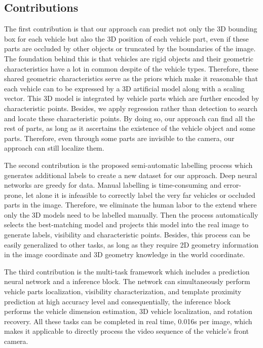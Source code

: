 \subsection{Contributions}

The first contribution is that our approach can predict not only the 3D bounding box for each vehicle but also the 3D position of each vehicle part, even if these parts are occluded by other objects or truncated by the boundaries of the image. The foundation behind this is that vehicles are rigid objects and their geometric characteristics have a lot in common despite of the vehicle types. Therefore, these shared geometric characteristics serve as the priors which make it reasonable that each vehicle can to be expressed by a 3D artificial model along with a scaling vector. This 3D model is integrated by vehicle parts which are further encoded by characteristic points. Besides, we apply regression rather than detection to search and locate these characteristic points. By doing so, our approach can find all the rest of parts, as long as it ascertains the existence of the vehicle object and some parts. Therefore, even through some parts are invisible to the camera, our approach can still localize them. 

The second contribution is the proposed semi-automatic labelling process which generates additional labels to create a new dataset for our approach.  Deep neural networks are greedy for data. Manual labelling is time-consuming and error-prone, let alone it is infeasible to correctly label the very far vehicles or occluded parts in the image. Therefore, we eliminate the human labor to the extend where only the 3D models need to be labelled manually. Then the process automatically selects the best-matching model and projects this model into the real image to generate labels, \eg visibility and characteristic points.  Besides, this process can be easily generalized to other tasks, as long as they require 2D geometry information in the image coordinate and 3D geometry knowledge in the world coordinate.

The third contribution is the multi-task framework which includes a prediction neural network and a inference block. The network can simultaneously perform vehicle parts localization, visibility characterization, and template proximity prediction at high accuracy level and consequentially, the inference block performs the vehicle dimension estimation,  3D vehicle localization, and rotation recovery. All these tasks can be completed in real time, 0.016s per image, which makes it applicable to directly process the video sequence of the vehicle's front camera.